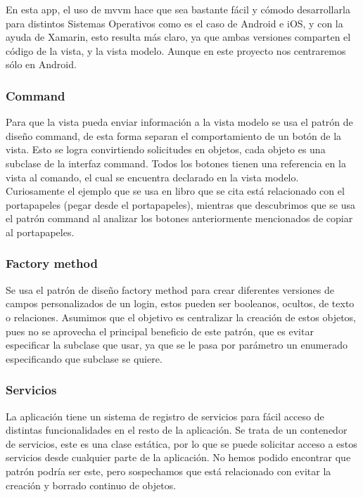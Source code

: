 En esta app, el uso de \gls{mvvm} hace que sea bastante fácil y cómodo desarrollarla para distintos Sistemas Operativos como es el caso de Android e iOS, y con la ayuda de Xamarin, esto resulta más claro, ya que ambas versiones comparten el código de la vista, y la vista modelo. Aunque en este proyecto nos centraremos sólo en Android.

\subsubsection{Command}

Para que la vista pueda enviar información a la vista modelo se usa el patrón de diseño command, de esta forma separan el comportamiento de un botón de la vista. Esto se logra convirtiendo solicitudes en objetos, cada objeto es una subclase de la interfaz command\cite{ulpgc.183475}\cite{García2023intro}. Todos los botones tienen una referencia en la vista al comando, el cual se encuentra declarado en la vista modelo. Curiosamente el ejemplo que se usa en libro que se cita está relacionado con el portapapeles (pegar desde el portapapeles), mientras que descubrimos que se usa el patrón command al analizar los botones anteriormente mencionados de copiar al portapapeles.

\subsubsection{Factory method}

Se usa el patrón de diseño factory method para crear diferentes versiones de campos personalizados de un \gls{login}, estos pueden ser booleanos, ocultos, de texto o relaciones. Asumimos que el objetivo es centralizar la creación de estos objetos, pues no se aprovecha el principal beneficio de este patrón, que es evitar especificar la subclase que usar, ya que se le pasa por parámetro un enumerado especificando que subclase se quiere\cite{ulpgc.183475}\cite{García2023intro}.

\subsubsection{Servicios}
La aplicación tiene un sistema de registro de servicios para fácil acceso de distintas funcionalidades en el resto de la aplicación. Se trata de un contenedor de servicios, este es una clase estática, por lo que se puede solicitar acceso a estos servicios desde cualquier parte de la aplicación. No hemos podido encontrar que patrón podría ser este, pero sospechamos que está relacionado con evitar la creación y borrado continuo de objetos.

